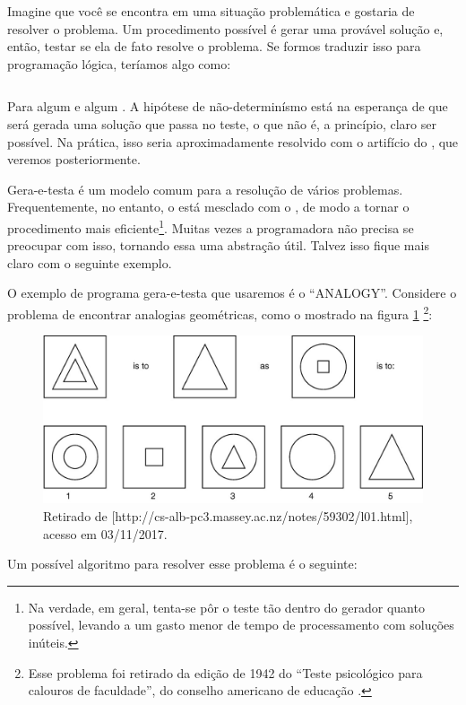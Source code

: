 \documentclass{article}
\begin{document}
  Imagine que você se encontra em uma situação problemática e gostaria de resolver o problema. Um procedimento possível é gerar uma provável solução e, então, testar se ela de fato resolve o problema. Se formos traduzir isso para programação lógica, teríamos algo como:

\inputminted{prolog}{../Exemplos/Cap1/prog2_encontra.pl}

Para algum  e algum . A hipótese de não-determinísmo está na esperança de que será gerada uma solução que passa no teste, o que não é, a princípio, claro ser possível. Na prática, isso seria aproximadamente resolvido com o artifício do , que veremos posteriormente.

Gera-e-testa é um modelo comum para a resolução de vários problemas. Frequentemente, no entanto, o  está mesclado com o , de modo a tornar o procedimento mais eficiente\footnote{Na verdade, em geral, tenta-se pôr o teste tão dentro do gerador quanto possível, levando a um gasto menor de tempo de processamento com soluções inúteis.}. Muitas vezes a programadora não precisa se preocupar com isso, tornando essa uma abstração útil. Talvez isso fique mais claro com o seguinte exemplo.

O exemplo de programa gera-e-testa que usaremos é o ``ANALOGY''. Considere o problema de encontrar analogias geométricas, como o mostrado na figura \ref{fig:psi} \footnote{Esse problema foi retirado da edição de 1942 do ``Teste psicológico para calouros de faculdade'', do conselho americano de educação \cite{evans}.}:

\begin{figure}[h]
  \caption{Retirado de [http://cs-alb-pc3.massey.ac.nz/notes/59302/l01.html], acesso em 03/11/2017.}\label{fig:psi}
  \centering
  \includegraphics[width=\linewidth]{analogy}
\end{figure}

Um possível algoritmo para resolver esse problema é o seguinte:
\end{document}
